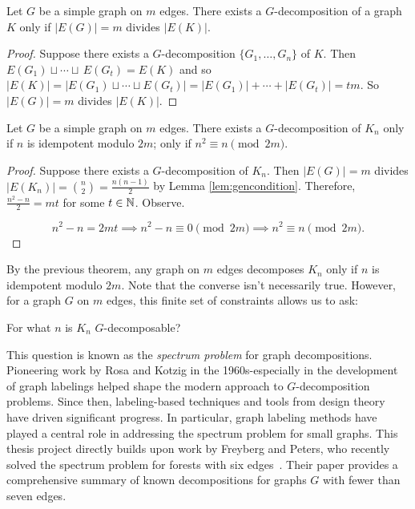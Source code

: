 \begin{lemma} \label{lem:gencondition}
  Let $G$ be a simple graph on $m$ edges. There exists a $G$-decomposition of a graph $K$ only if $|E(G)|=m$ divides $|E(K)|$. 
\end{lemma}

  \begin{proof}
  Suppose there exists a $G$-decomposition $\{G_{1},\hdots, G_{n}\}$ of $K$. Then $E(G_{1})\sqcup \cdots \sqcup\,E(G_{t})=E(K)$ and so $|E(K)|=|E(G_{1})\sqcup \cdots \sqcup E(G_{t})|=|E(G_{1})|+ \cdots + |E(G_{t})|=tm$. So $|E(G)|=m$ divides $|E(K)|$.
  \end{proof}

\begin{thm} \label{thm:Kncondition}
  Let $G$ be a simple graph on $m$ edges. There exists a $G$-decomposition of $K_{n}$ only if $n$ is idempotent modulo $2m$; only if $n^{2}\equiv n\pmod{2m}$.
\end{thm}

\begin{proof}
  Suppose there exists a $G$-decomposition of $K_{n}$. Then $|E(G)|=m$ divides $|E(K_{n})|=\binom{n}{2}=\frac{n(n-1)}{2}$ by Lemma \ref{lem:gencondition}. Therefore, $\frac{n^{2}-n}{2}=mt$ for some $t\in \mathbb{N}$. Observe.

  $$n^{2}-n= 2mt\implies n^{2}-n\equiv 0\pmod{2m}\implies n^{2}\equiv n\pmod{2m}.$$
\end{proof}
By the previous theorem, any graph on $m$ edges decomposes $K_{n}$ only if $n$ is idempotent modulo $2m$. Note that the converse isn't necessarily true. However, for a graph $G$ on $m$ edges, this finite set of constraints allows us to ask:
\begin{center}
For what $n$ is $K_{n}$ $G$-decomposable?
\end{center}
This question is known as the \textit{spectrum problem} for graph decompositions. Pioneering work by Rosa and Kotzig in the 1960s-especially in the development of graph labelings helped shape the modern approach to $G$-decomposition problems. Since then, labeling-based techniques and tools from design theory have driven significant progress. In particular, graph labeling methods have played a central role in addressing the spectrum problem for small graphs. This thesis project directly builds upon work by Freyberg and Peters, who recently solved the spectrum problem for forests with six edges~\cite{FreybergPeters2024}. Their paper provides a comprehensive summary of known decompositions for graphs $G$ with fewer than seven edges.


